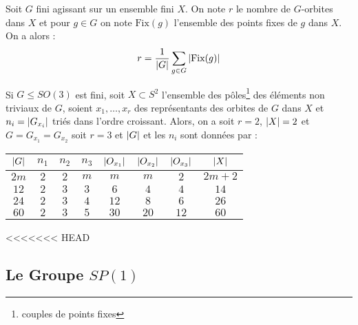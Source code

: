 \documentclass{cours}
\begin{document}
\begin{lemma}
    Soit $G$ fini agissant sur un ensemble fini $X$. On note $r$ le nombre de $G$-orbites dans $X$ et pour $g \in G$ on note $\text{Fix}(g)$ l'ensemble des points fixes de $g$ dans $X$. On a alors :
    \[
        r = \frac{1}{\left|G\right|} \sum_{g \in G}  \left|\text{Fix}(g)\right|
    \]
\end{lemma}

\begin{lemma}
    Si $G \leq SO(3)$ est fini, soit $X \subset S^{2}$ l'ensemble des pôles\footnote{couples de points fixes} des éléments non triviaux de $G$, soient $x_{1}, \ldots, x_{r}$ des représentants des orbites de $G$ dans $X$ et $n_{i} = \left|G_{x_{i}}\right|$ triés dans l'ordre croissant. Alors, on a soit $r = 2$, $\left|X\right| = 2$ et $G = G_{x_{1}} = G_{x_{2}}$ soit $r = 3$ et $\left|G\right|$ et les $n_{i}$ sont données par : 
    \begin{center}
        \begin{tabular}{cccccccc}
            $\left|G\right|$ & $n_{1}$ & $n_{2}$ & $n_{3}$ & $\left|O_{x_{1}}\right|$ & $\left|O_{x_{2}}\right|$ & $\left|O_{x_{3}}\right|$ & $\left|X\right|$\\
            \midrule
            $2m$ & $2$ & $2$ & $m$ & $m$ & $m$ & $2$ & $2m+2$\\
            \midrule
            $12$ & $2$ & $3$ & $3$ & $6$ & $4$ & $4$ & $14$\\
            \midrule
            $24$ & $2$ & $3$ & $4$ & $12$ & $8$ & $6$ & $26$\\
            \midrule
            $60$ & $2$ & $3$ & $5$ & $30$ & $20$ & $12$ & $60$            
        \end{tabular}
    \end{center}
\end{lemma}

<<<<<<< HEAD
\subsection{Le Groupe $SP(1)$}
\end{document}
